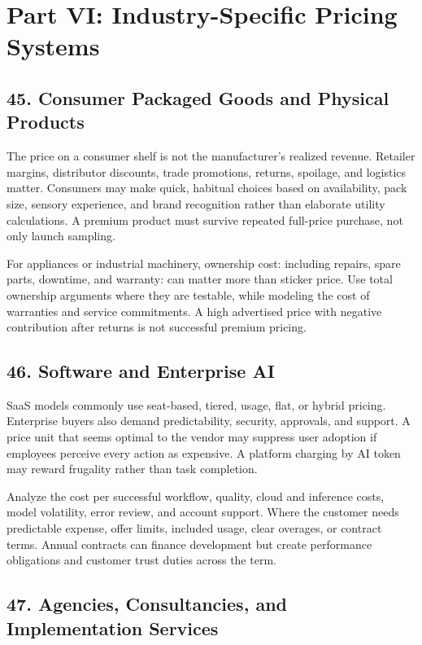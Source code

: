\section*{Part VI: Industry-Specific Pricing Systems}

\subsection*{45. Consumer Packaged Goods and Physical Products}

The price on a consumer shelf is not the manufacturer's realized revenue. Retailer margins, distributor discounts, trade promotions, returns, spoilage, and logistics matter. Consumers may make quick, habitual choices based on availability, pack size, sensory experience, and brand recognition rather than elaborate utility calculations. A premium product must survive repeated full-price purchase, not only launch sampling.

For appliances or industrial machinery, ownership cost: including repairs, spare parts, downtime, and warranty: can matter more than sticker price. Use total ownership arguments where they are testable, while modeling the cost of warranties and service commitments. A high advertised price with negative contribution after returns is not successful premium pricing.

\subsection*{46. Software and Enterprise AI}

SaaS models commonly use seat-based, tiered, usage, flat, or hybrid pricing. Enterprise buyers also demand predictability, security, approvals, and support. A price unit that seems optimal to the vendor may suppress user adoption if employees perceive every action as expensive. A platform charging by AI token may reward frugality rather than task completion.

Analyze the cost per successful workflow, quality, cloud and inference costs, model volatility, error review, and account support. Where the customer needs predictable expense, offer limits, included usage, clear overages, or contract terms. Annual contracts can finance development but create performance obligations and customer trust duties across the term.

\subsection*{47. Agencies, Consultancies, and Implementation Services}

